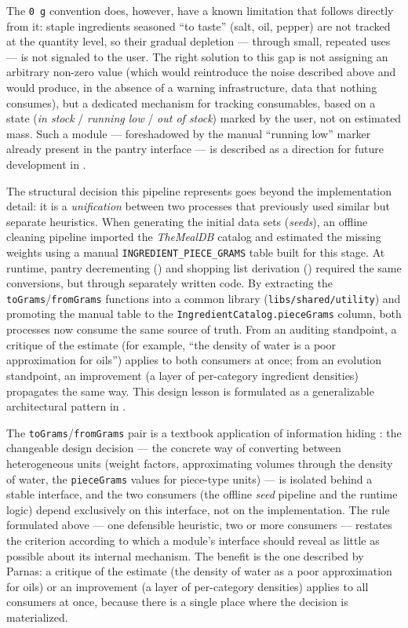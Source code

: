 The \texttt{0 g} convention does, however, have a known limitation that follows directly from it: staple ingredients seasoned “to taste” (salt, oil, pepper) are not tracked at the quantity level, so their gradual depletion --- through small, repeated uses --- is not signaled to the user. The right solution to this gap is not assigning an arbitrary non-zero value (which would reintroduce the noise described above and would produce, in the absence of a warning infrastructure, data that nothing consumes), but a dedicated mechanism for tracking consumables, based on a state (\textit{in stock} / \textit{running low} / \textit{out of stock}) marked by the user, not on estimated mass. Such a module --- foreshadowed by the manual “running low” marker already present in the pantry interface --- is described as a direction for future development in .

The structural decision this pipeline represents goes beyond the implementation detail: it is a \textit{unification} between two processes that previously used similar but separate heuristics. When generating the initial data sets (\textit{seeds}), an offline cleaning pipeline imported the \textit{TheMealDB} catalog and estimated the missing weights using a manual \texttt{INGREDIENT\_PIECE\_GRAMS} table built for this stage. At runtime, pantry decrementing () and shopping list derivation () required the same conversions, but through separately written code. By extracting the \texttt{toGrams}/\texttt{fromGrams} functions into a common library (\texttt{libs/shared/utility}) and promoting the manual table to the \texttt{IngredientCatalog.pieceGrams} column, both processes now consume the same source of truth. From an auditing standpoint, a critique of the estimate (for example, “the density of water is a poor approximation for oils”) applies to both consumers at once; from an evolution standpoint, an improvement (a layer of per-category ingredient densities) propagates the same way. This design lesson is formulated as a generalizable architectural pattern in .

The \texttt{toGrams}/\texttt{fromGrams} pair is a textbook application of information hiding \cite{parnas1972}: the changeable design decision --- the concrete way of converting between heterogeneous units (weight factors, approximating volumes through the density of water, the \texttt{pieceGrams} values for piece-type units) --- is isolated behind a stable interface, and the two consumers (the offline \textit{seed} pipeline and the runtime logic) depend exclusively on this interface, not on the implementation. The rule formulated above --- one defensible heuristic, two or more consumers --- restates the criterion according to which a module's interface should reveal as little as possible about its internal mechanism. The benefit is the one described by Parnas: a critique of the estimate (the density of water as a poor approximation for oils) or an improvement (a layer of per-category densities) applies to all consumers at once, because there is a single place where the decision is materialized.

